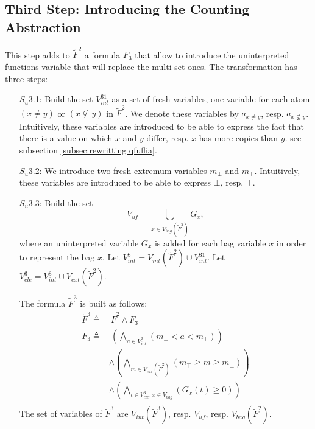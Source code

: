 \subsection{Third Step: Introducing the Counting Abstraction}
This step adds to $\tilde{F}^2$ a formula $F_3$ that allow to introduce the uninterpreted functions variable that will replace the multi-set ones. The transformation has three steps:

\begin{enumerate}
\item[$S_u$3.1:] Build the set $V^{31}_{int}$ as a set of fresh variables, one variable for each atom $(x \neq y)$ or $(x \nsubseteq y)$ in $\tilde{F}^2$.
We denote these variables by $a_{x \neq y}$, resp. $a_{x \nsubseteq y}$.
Intuitively, these variables are introduced to be able to express the fact that there is a value on which $x$ and $y$ differ, resp. $x$ has more copies than $y$.
see subsection \ref{subsec:rewritting qfuflia}.

\item[$S_u$3.2:] We introduce two fresh extremum variables $m_{\bot}$ and $m_{\top}$.
Intuitively, these variables are introduced to be able to express $\bot$, resp. $\top$.

\item[$S_u$3.3:] Build the set
$$V_{\textit{uf}}  =
\bigcup_{x\in V_{bag}(\tilde{F}^2)} G_{x},$$
where an uninterpreted variable $G_{x}$ is added for each bag variable $x$ in order to represent the bag $x$.
Let $V^3_{int} = V_{int}(\tilde{F}^2) \cup V^{31}_{int}$.
Let $V^3_{ele} = V^3_{int} \cup V_{ext}(\tilde{F}^2)$.

The formula $\tilde{F}^3$ is built as follows:
\begin{align}
  \tilde{F}^3 \triangleq &\
  \tilde{F}^2 \land F_{3} \\
  F_{3 } \triangleq &\
  \left(\bigwedge_{a \in V^{3}_{int}}(m_{\bot} < a < m_{\top})\right)
  \\
  & \land
  \left(\bigwedge_{m \in V_{ext}(\tilde{F}^2)}(m_{\top} \ge m \ge m_{\bot})\right)
  \\
  & \land
  \left(\bigwedge_{t \in V^3_{ele},x \in V_{bag}}(G_{x}(t) \ge 0)\right)
  \\
\end{align}
The set of variables of $\tilde{F}^3$ are $V_{int}(\tilde{F}^3)$, resp. $V_{\textit{uf}}$, resp. $V_{bag}(\tilde{F}^2)$.
\end{enumerate}

